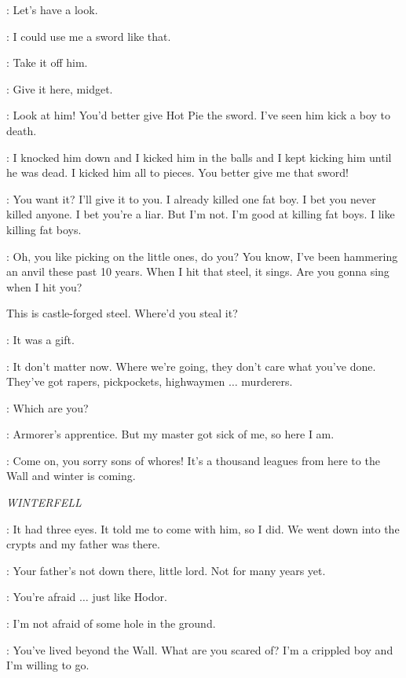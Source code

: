 \LOMMY: Let's have a look. 

\HOTPIE: I could use me a sword like that. 

\LOMMY: Take it off him. 

\HOTPIE: Give it here, midget. 

\LOMMY: Look at him! You'd better give Hot Pie the sword. I've seen him kick a boy to death. 

\HOTPIE: I knocked him down and I kicked him in the balls and I kept kicking him until he was dead. I kicked him all to pieces. You better give me that sword! 

\ARYA: You want it? I'll give it to you. I already killed one fat boy. I bet you never killed anyone. I bet you're a liar. But I'm not. I'm good at killing fat boys. I like killing fat boys. 

\GENDRY: Oh, you like picking on the little ones, do you? You know, I've been hammering an anvil these past 10 years. When I hit that steel, it sings. Are you gonna sing when I hit you? 


This is castle-forged steel. Where'd you steal it? 

\ARYA: It was a gift. 

\GENDRY: It don't matter now. Where we're going, they don't care what you've done. They've got rapers, pickpockets, highwaymen $\ldots$ murderers. 

\ARYA: Which are you? 

\GENDRY: Armorer's apprentice. But my master got sick of me, so here I am. 

\YOREN: Come on, you sorry sons of whores! It's a thousand leagues from here to the Wall and winter is coming.


\scene

\textit{WINTERFELL} 


\BRAN: It had three eyes. It told me to come with him, so I did. We went down into the crypts and my father was there. 

\OSHA: Your father's not down there, little lord. Not for many years yet. 

\BRAN: You're afraid $\ldots$ just like Hodor. 

\OSHA: I'm not afraid of some hole in the ground. 

\BRAN: You've lived beyond the Wall. What are you scared of? I'm a crippled boy and I'm willing to go. 

